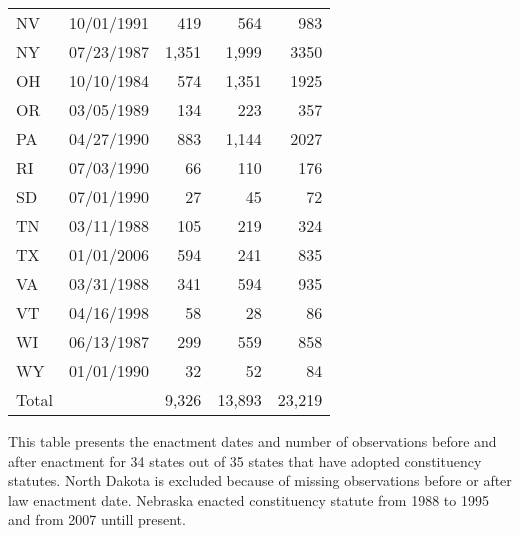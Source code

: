 \begin{table}[H]
\begin{tabular}{lrrrr}
		NV    & \multicolumn{1}{l}{10/01/1991} & 419   & 564   & 983 \\
		NY    & \multicolumn{1}{l}{07/23/1987} & 1,351 & 1,999 & 3350 \\
		OH    & \multicolumn{1}{l}{10/10/1984} & 574   & 1,351 & 1925 \\
		OR    & \multicolumn{1}{l}{03/05/1989} & 134   & 223   & 357 \\
		PA    & \multicolumn{1}{l}{04/27/1990} & 883   & 1,144 & 2027 \\
		RI    & \multicolumn{1}{l}{07/03/1990} & 66    & 110   & 176 \\
		SD    & \multicolumn{1}{l}{07/01/1990} & 27    & 45    & 72 \\
		TN    & \multicolumn{1}{l}{03/11/1988} & 105   & 219   & 324 \\
		TX    & \multicolumn{1}{l}{01/01/2006} & 594   & 241   & 835 \\
		VA    & \multicolumn{1}{l}{03/31/1988} & 341   & 594   & 935 \\
		VT    & \multicolumn{1}{l}{04/16/1998} & 58    & 28    & 86 \\
		WI    & \multicolumn{1}{l}{06/13/1987} & 299   & 559   & 858 \\
		WY    & \multicolumn{1}{l}{01/01/1990} & 32    & 52    & 84 \\
		\midrule
		Total  &       & 9,326 & 13,893 & 23,219 \\
		\bottomrule
		\bottomrule
	\end{tabular}%
	\label{tab:addlabel}%
\end{table}%
\noindent This table presents the enactment dates and number of observations before and after enactment for 34 states out of 35 states that have adopted constituency statutes. North Dakota is excluded because of missing observations before or after law enactment date. Nebraska enacted constituency statute from 1988 to 1995 and from 2007 untill present.

